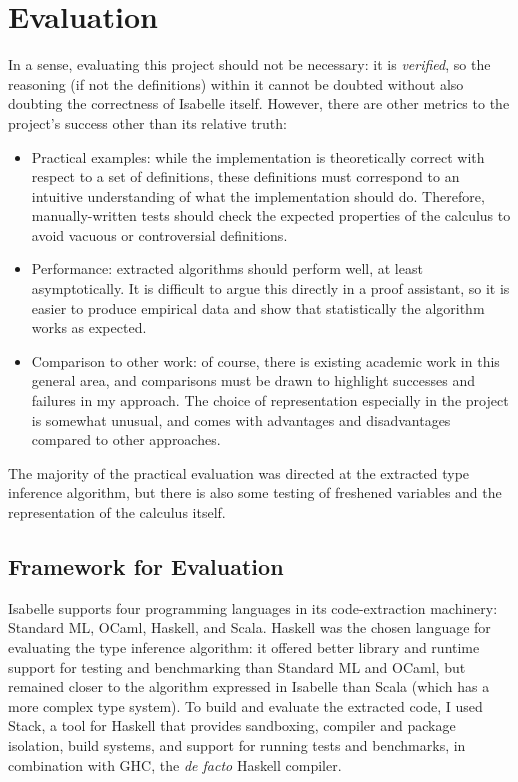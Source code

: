 \chapter{Evaluation}
In a sense, evaluating this project should not be necessary: it is \emph{verified}, so the reasoning (if not the definitions) within it cannot be doubted without also doubting the correctness of Isabelle itself.
However, there are other metrics to the project's success other than its relative truth:
\begin{itemize}
\item
Practical examples: while the implementation is theoretically correct with respect to a set of definitions, these definitions must correspond to an intuitive understanding of what the implementation should do.
Therefore, manually-written tests should check the expected properties of the calculus to avoid vacuous or controversial definitions.
\item
Performance: extracted algorithms should perform well, at least asymptotically.
It is difficult to argue this directly in a proof assistant, so it is easier to produce empirical data and show that statistically the algorithm works as expected.
\item
Comparison to other work: of course, there is existing academic work in this general area, and comparisons must be drawn to highlight successes and failures in my approach.
The choice of representation especially in the project is somewhat unusual, and comes with advantages and disadvantages compared to other approaches.
\end{itemize}

The majority of the practical evaluation was directed at the extracted type inference algorithm, but there is also some testing of freshened variables and the representation of the calculus itself.

\section{Framework for Evaluation}
Isabelle supports four programming languages in its code-extraction machinery: Standard ML, OCaml, Haskell, and Scala\cite{codegen-reference}.
Haskell was the chosen language for evaluating the type inference algorithm: it offered better library and runtime support for testing and benchmarking than Standard ML and OCaml, but remained closer to the algorithm expressed in Isabelle than Scala (which has a more complex type system).
To build and evaluate the extracted code, I used Stack\cite{stack}, a tool for Haskell that provides sandboxing, compiler and package isolation, build systems, and support for running tests and benchmarks, in combination with GHC\cite{GHC}, the \emph{de facto} Haskell compiler.

